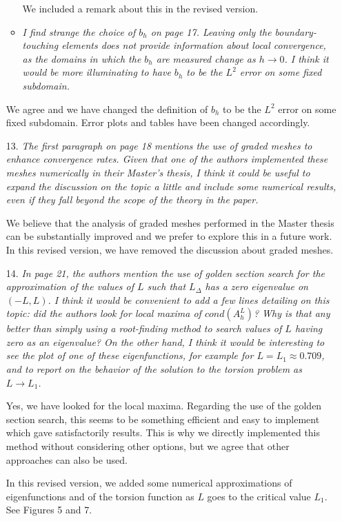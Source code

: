 \documentclass[11 pt]{article}
\numberwithin{equation}{section}
\begin{document}
\begin{enumerate}
\begin{itemize}
We included a remark about this in the revised version.

        \item \emph{I find strange the choice of \(b_{h}\) on page 17. Leaving only the boundary-touching elements does not provide information about local convergence, as the domains in which the \(b_{h}\) are measured change as \(h\to 0\). I think it would be more illuminating to have \(b_{h}\) to be the \(L^{2}\) error on some fixed subdomain.}
    \end{itemize}

    We agree and we have changed the definition of \(b_{h}\) to be the \(L^{2}\) error on some fixed subdomain.  Error plots and tables have been changed accordingly.

    \item[13.] \emph{The first paragraph on page 18 mentions the use of graded meshes to enhance convergence rates. Given that one of the authors implemented these meshes numerically in their Master's thesis, I think it could be useful to expand the discussion on the topic a little and include some numerical results, even if they fall beyond the scope of the theory in the paper.}

    We believe that the analysis of graded meshes performed in the Master thesis can be substantially improved and we prefer to explore this in a future work.  In this revised version, we have removed the discussion about graded meshes.

    \item[14.] \emph{In page 21, the authors mention the use of golden section search for the approximation of the values of \(L\) such that \(L_{\Delta}\) has a zero eigenvalue on \((-L,L)\). I think it would be convenient to add a few lines detailing on this topic: did the authors look for local maxima of \(cond(A_{h}^{L})\)? Why is that any better than simply using a root-finding method to search values of \(L\) having zero as an eigenvalue? On the other hand, I think it would be interesting to see the plot of one of these eigenfunctions, for example for \(L=L_{1}\approx 0.709\), and to report on the behavior of the solution to the torsion problem as \(L\to L_{1}\).}

    Yes, we have looked for the local maxima. Regarding the use of the golden section search, this seems to be something efficient and easy to implement which gave satisfactorily results. This is why we directly implemented this method without considering other options, but we agree that other approaches can also be used.

    In this revised version, we added some numerical approximations of eigenfunctions and of the torsion function as $L$ goes to the critical value $L_1.$  See Figures 5 and 7.

\end{enumerate}
\end{document}
